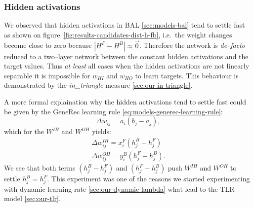 
\subsubsection{Hidden activations}
\label{sec:our-hidden-activation} 

We observed that hidden activations in BAL \ref{sec:models-bal} tend to settle fast as shown on figure~\ref{fig:results-candidates-dist-h-fb}, i.e.~the weight changes become close to zero because $|H^F - H^B| \approx \overrightarrow{0}$. Therefore the network is \emph{de--facto} reduced to a two--layer network between the constant hidden activations and the target values. Thus \emph{at least} all cases when the hidden activations are not linearly separable it is impossible for $w_{HI}$ and $w_{HO}$ to learn targets. This behaviour is demonstrated by the \emph{in\_triangle} measure \ref{sec:our-in-triangle}. 

A more formal explaination why the hidden activations tend to settle fast could be given by the GeneRec learning rule \ref{eq:models-generec-learning-rule}: 
\begin{equation} 
  \Delta w_{ij} = a_i(b_j - a_j),
\end{equation} \nonumber 
which for the $W^{IH}$ and $W^{OH}$ yields: 
\begin{align} 
  \Delta w_{ij}^{IH} = x^F_i(h^B_j - h^F_j) \nonumber \\ 
  \Delta w_{ij}^{OH} = y^B_i(h^F_j - h^B_j). \nonumber  
\end{align} 
We see that both terms $(h^B_j - h^F_j)$ and $(h^F_j - h^B_j)$ push $W^{IH}$ and $W^{OH}$ to settle $h^B_j = h^F_j$. This experiment was one of the reasons we started experimenting with dynamic learning rate \ref{sec:our-dynamic-lambda} what lead to the TLR model \ref{sec:our-tlr}. 

